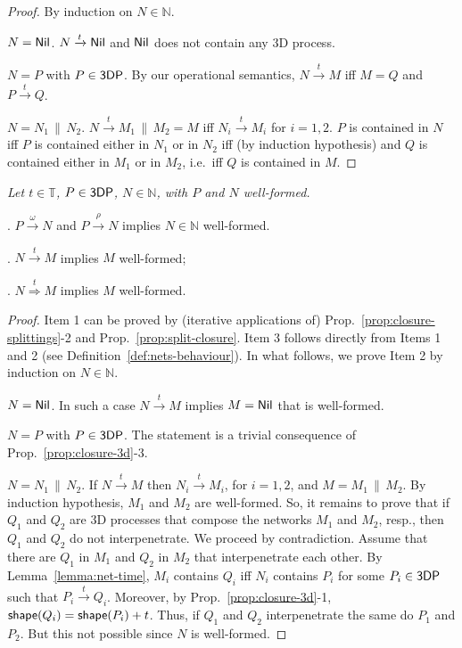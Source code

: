\documentclass[11pt]{article}
\newcommand{\proc}{\sf{3DP}}
\newcommand{\NIL}{{\sf Nil}}
\newcommand{\nar}[1]{\xrightarrow{#1}}
\newcommand{\dnar}[1]{\stackrel{#1}{\Rightarrow}}
\newcommand{\nets}{{\mathbb N}}
\newcommand{\shape}{{\sf shape}}
\newcommand{\timedomain}{{\mathbb T}}
\begin{document}
\begin{proof}
By induction on $N \in \nets$.
\par\smallskip\noindent
$N = \NIL$.  $N \nar{t} \NIL$ and $\NIL$ does not contain any 3D
process.
\par\smallskip\noindent
 $N = P$ with $P\in \proc$. By our operational semantics, $N \nar{t} M$ iff $M = Q$ and
$P \nar{t} Q$.
\par\smallskip\noindent 
$N = N_1 \,\| \, N_2$.  $N \nar{t} M_1 \,\| \, M_2 = M$ iff  $N_i \nar{t} M_i$ for $i=1,2$.
$P$ is contained in $N$ iff $P$ is contained either in $N_1$ or in $N_2$ iff (by induction
hypothesis) and $Q$ is contained either in $M_1$ or in $M_2$, i.e.\ iff $Q$ is contained in $M$.
\end{proof}

\par\medskip{}
\em Let $t \in \timedomain$, $P\in \proc$, $N\in \nets$, with $P$ and $N$ well-formed.

\par\smallskip{}. $P \nar{\omega} N$ and $P \nar{\rho} N$ implies $N \in \nets$
well-formed.

\par\smallskip{}. $N \nar{t} M$ implies $M$ well-formed;

\par\medskip{}. $N \dnar{t} M$ implies $M$ well-formed.\rm

\par\medskip\noindent \begin{proof}
Item 1 can be proved by (iterative applications of) Prop.~\ref{prop:closure-splittings}-2 and
Prop.~\ref{prop:split-closure}. Item 3 follows directly from Items 1 and 2 (see
Definition~\ref{def:nets-behaviour}). In what follows, we prove Item 2 by induction on $N\in \nets$.
\par\medskip\noindent
 $N = \NIL$. In such a case $N \nar{t} M$ implies $M=\NIL$ that is  well-formed.
\par\medskip\noindent
$N = P$ with $P\in \proc$. The statement is a trivial consequence of
Prop.~\ref{prop:closure-3d}-3.
\par\medskip\noindent 
$N = N_1 \,\| \, N_2$. If $N \nar{t} M$  then $N_i \nar{t} M_i$, for $i=1,2$, and $M  = M_1 \,\| \,
M_2$. By induction hypothesis, $M_1$ and $M_2$ are well-formed. So, it remains to prove that if
$Q_1$ and $Q_2$ are 3D processes that compose the networks $M_1$ and $M_2$, resp., then $Q_1$ and
$Q_2$ do not interpenetrate. We proceed by contradiction. Assume that there are $Q_1$ in $M_1$ and
$Q_2$ in $M_2$ that interpenetrate each other. By Lemma~\ref{lemma:net-time},  $M_i$ contains $Q_i$
iff $N_i$ contains $P_i$ for some $P_i \in \proc$ such  that $P_i \nar{t} Q_i$. Moreover, by
Prop.~\ref{prop:closure-3d}-1, $\shape(Q_i) = \shape(P_i) + t$. Thus, if $Q_1$ and $Q_2$
interpenetrate the same do $P_1$ and $P_2$. But this not possible since $N$ is well-formed.
\end{proof}
\end{document}
